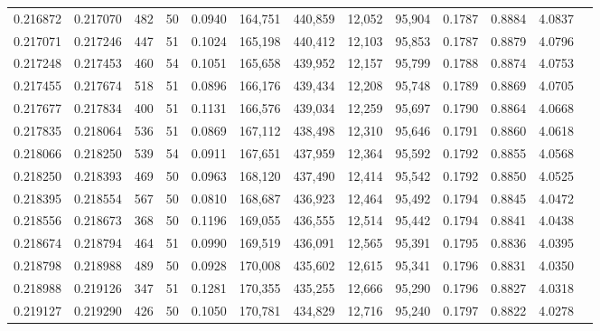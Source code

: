 \begin{tabular}{rrrrrrrrrrrrr}
0.216872 & 0.217070 &   482 &  50 &                                     0.0940 & 164,751 & 440,859 &  12,052 &  95,904 & 0.1787 & 0.8884 & 4.0837 \\
0.217071 & 0.217246 &   447 &  51 &                                     0.1024 & 165,198 & 440,412 &  12,103 &  95,853 & 0.1787 & 0.8879 & 4.0796 \\
0.217248 & 0.217453 &   460 &  54 &                                     0.1051 & 165,658 & 439,952 &  12,157 &  95,799 & 0.1788 & 0.8874 & 4.0753 \\
0.217455 & 0.217674 &   518 &  51 &                                     0.0896 & 166,176 & 439,434 &  12,208 &  95,748 & 0.1789 & 0.8869 & 4.0705 \\
0.217677 & 0.217834 &   400 &  51 &                                     0.1131 & 166,576 & 439,034 &  12,259 &  95,697 & 0.1790 & 0.8864 & 4.0668 \\
0.217835 & 0.218064 &   536 &  51 &                                     0.0869 & 167,112 & 438,498 &  12,310 &  95,646 & 0.1791 & 0.8860 & 4.0618 \\
0.218066 & 0.218250 &   539 &  54 &                                     0.0911 & 167,651 & 437,959 &  12,364 &  95,592 & 0.1792 & 0.8855 & 4.0568 \\
0.218250 & 0.218393 &   469 &  50 &                                     0.0963 & 168,120 & 437,490 &  12,414 &  95,542 & 0.1792 & 0.8850 & 4.0525 \\
0.218395 & 0.218554 &   567 &  50 &                                     0.0810 & 168,687 & 436,923 &  12,464 &  95,492 & 0.1794 & 0.8845 & 4.0472 \\
0.218556 & 0.218673 &   368 &  50 &                                     0.1196 & 169,055 & 436,555 &  12,514 &  95,442 & 0.1794 & 0.8841 & 4.0438 \\
0.218674 & 0.218794 &   464 &  51 &                                     0.0990 & 169,519 & 436,091 &  12,565 &  95,391 & 0.1795 & 0.8836 & 4.0395 \\
0.218798 & 0.218988 &   489 &  50 &                                     0.0928 & 170,008 & 435,602 &  12,615 &  95,341 & 0.1796 & 0.8831 & 4.0350 \\
0.218988 & 0.219126 &   347 &  51 &                                     0.1281 & 170,355 & 435,255 &  12,666 &  95,290 & 0.1796 & 0.8827 & 4.0318 \\
0.219127 & 0.219290 &   426 &  50 &                                     0.1050 & 170,781 & 434,829 &  12,716 &  95,240 & 0.1797 & 0.8822 & 4.0278 \\

\end{tabular}
